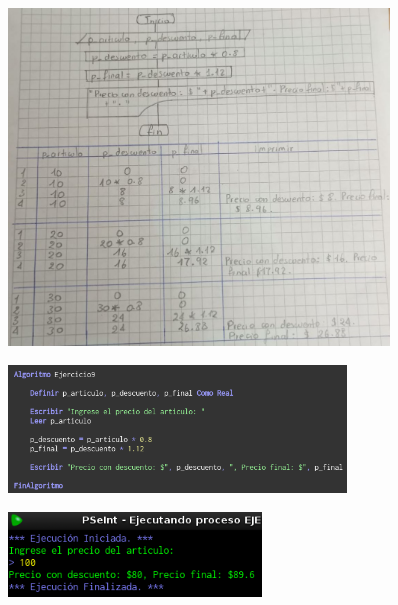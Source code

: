 \documentclass[12pt]{article}
\begin{document}
\begin{enumerate}
                \begin{figure}[!h]
                    \centering
                    \includegraphics[width=0.9\textwidth]{Img/DF_ej9.jpeg}
                \end{figure}

                \begin{figure}[!h]
                    \centering
                    \includegraphics[width=0.8\textwidth]{Img/Cod_ej9.png}
                \end{figure}

                \newpage
                \begin{figure}[!h]
                    \centering
                    \includegraphics[width=0.6\textwidth]{Img/Ejec_ej9.png}
                \end{figure}
            

\end{enumerate}
\end{document}
